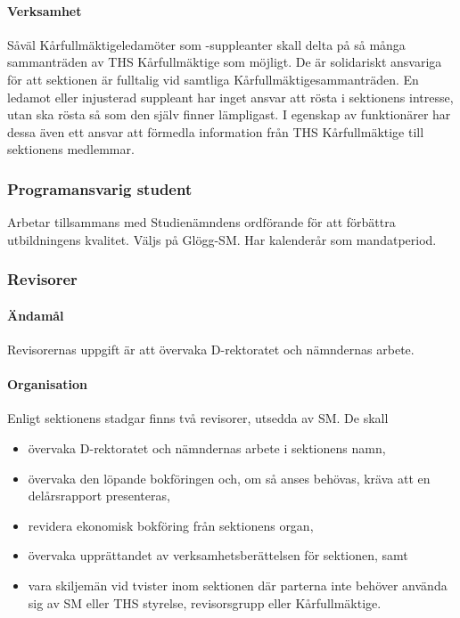 \documentclass{dgovdoc}
\begin{document}
\paragraph{Verksamhet}

Såväl Kårfullmäktigeledamöter som -suppleanter skall delta på så många sammanträden
av THS Kårfullmäktige som möjligt. De är solidariskt ansvariga för att sektionen
är fulltalig vid samtliga Kårfullmäktigesammanträden. En ledamot eller injusterad suppleant
har inget ansvar att rösta i sektionens intresse, utan ska rösta så som den själv
finner lämpligast. I egenskap av funktionärer har dessa även ett ansvar att förmedla
information från THS Kårfullmäktige till sektionens medlemmar.

\subsubsection{Programansvarig student}

Arbetar tillsammans med Studienämndens ordförande för att förbättra
utbildningens kvalitet. Väljs på Glögg-SM. Har kalenderår som mandatperiod.

\subsubsection{Revisorer}

\paragraph{Ändamål}

Revisorernas uppgift är att övervaka D-rektoratet och nämndernas arbete.

\paragraph{Organisation}

Enligt sektionens stadgar finns två revisorer, utsedda av SM. De skall

\begin{itemize}
  \item övervaka D-rektoratet och nämndernas arbete i sektionens namn,
  \item övervaka den löpande bokföringen och, om så anses behövas, kräva att en
    delårsrapport presenteras,
  \item revidera ekonomisk bokföring från sektionens organ,
  \item övervaka upprättandet av verksamhetsberättelsen för sektionen, samt
  \item vara skiljemän vid tvister inom sektionen där parterna inte behöver
    använda sig av SM eller THS styrelse, revisorsgrupp eller Kårfullmäktige.
\end{itemize}
\end{document}

